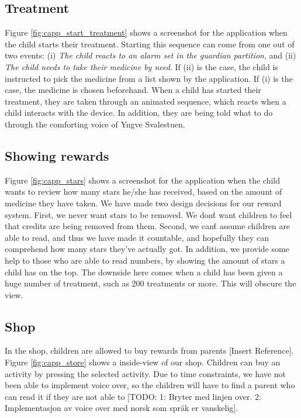 \subsection{Treatment}
\label{sec:sec:description-treatment}
Figure \ref{fig:capp_start_treatment} shows a screenshot for the application when the child starts their treatment. Starting this sequence can come from one out of two events: (i) \emph{The child reacts to an alarm set in the guardian partition}, and (ii) \emph{The child needs to take their medicine by need}. If (ii) is the case, the child is instructed to pick the medicine from a list shown by the application. If (i) is the case, the medicine is chosen beforehand. When a child has started their treatment, they are taken through an animated sequence, which reacts when a child interacts with the device. In addition, they are being told what to do through the comforting voice of Yngve Svalestuen.  


\subsection{Showing rewards}
\label{sec:description-show-rewards}
Figure \ref{fig:capp_stars} shows a screenshot for the application when the child wants to review how many stars he/she has received, based on the amount of medicine they have taken. We have made two design decisions for our reward system. First, we never want stars to be removed. We don\'t want children to feel that credits are being removed from them. Second, we can\'t assume children are able to read, and thus we have made it countable, and hopefully they can comprehend how many stars they've actually got. In addition, we provide some help to those who are able to read numbers, by showing the amount of stars a child has on the top. The downside here comes when a child has been given a huge number of treatment, such as 200 treatments or more. This will obscure the view.     

\subsection{Shop}
\label{sec:description-shop}
In the shop, children are allowed to buy rewards from parents [Insert Reference]. Figure \ref{fig:capp_store} shows a inside-view of our shop. Children can buy an activity by pressing the selected activity. Due to time constraints, we have not been able to implement voice over, so the children will have to find a parent who can read it if they are not able to [TODO: 1: Bryter med linjen over. 2: Implementasjon av voice over med norsk som språk er vanskelig]. 



